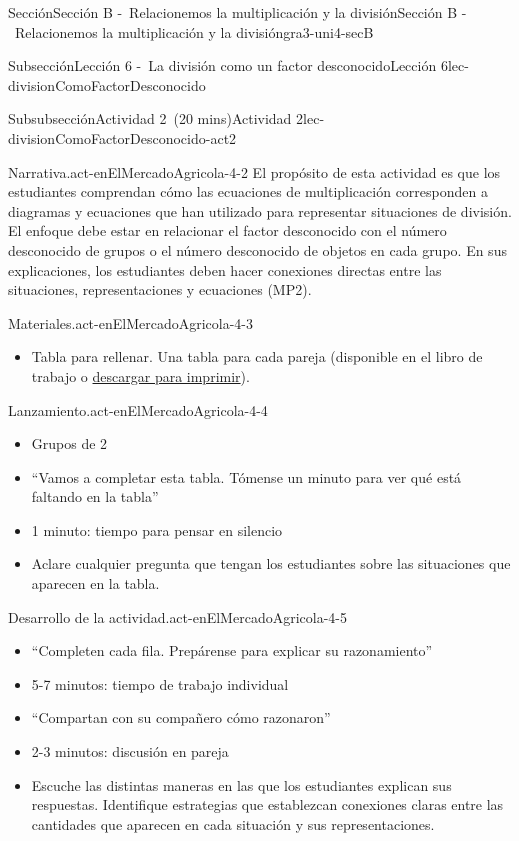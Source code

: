 \documentclass[oneside,10pt,]{article}
\begin{document}
\begin{sectionptx}{Sección}{Sección B -~Relacionemos la multiplicación y la división}{}{Sección B -~Relacionemos la multiplicación y la división}{}{}{gra3-uni4-secB}
\begin{subsectionptx}{Subsección}{Lección 6 -~La división como un factor desconocido}{}{Lección 6}{}{}{lec-divisionComoFactorDesconocido}
\begin{subsubsectionptx}{Subsubsección}{Actividad 2~(20 mins)}{}{Actividad 2}{}{}{lec-divisionComoFactorDesconocido-act2}
\begin{paragraphs}{Narrativa.}{act-enElMercadoAgricola-4-2}
El propósito de esta actividad es que los estudiantes comprendan cómo las ecuaciones de multiplicación corresponden a diagramas y ecuaciones que han utilizado para representar situaciones de división. El enfoque debe estar en relacionar el factor desconocido con el número desconocido de grupos o el número desconocido de objetos en cada grupo. En sus explicaciones, los estudiantes deben hacer conexiones directas entre las situaciones, representaciones y ecuaciones (MP2).%
\end{paragraphs}%
\begin{paragraphs}{Materiales.}{act-enElMercadoAgricola-4-3}%
%
\begin{itemize}[label=\textbullet]
\item{}Tabla para rellenar. Una tabla para cada pareja (disponible en el libro de trabajo o \href{external/act-pdf/act-enElMercadoAgricola.pdf}{descargar para imprimir}\footnotemark{}).%
\end{itemize}
\end{paragraphs}%
\begin{paragraphs}{Lanzamiento.}{act-enElMercadoAgricola-4-4}%
%
\begin{itemize}[label=\textbullet]
\item{}Grupos de 2%
\item{}``Vamos a completar esta tabla. Tómense un minuto para ver qué está faltando en la tabla''%
\item{}1 minuto: tiempo para pensar en silencio%
\item{}Aclare cualquier pregunta que tengan los estudiantes sobre las situaciones que aparecen en la tabla.%
\end{itemize}
\end{paragraphs}%
\begin{paragraphs}{Desarrollo de la actividad.}{act-enElMercadoAgricola-4-5}%
%
\begin{itemize}[label=\textbullet]
\item{}``Completen cada fila. Prepárense para explicar su razonamiento''%
\item{}5-7 minutos: tiempo de trabajo individual%
\item{}``Compartan con su compañero cómo razonaron''%
\item{}2-3 minutos: discusión en pareja%
\item{}Escuche las distintas maneras en las que los estudiantes explican sus respuestas. Identifique estrategias que establezcan conexiones claras entre las cantidades que aparecen en cada situación y sus representaciones.%

\end{itemize}
\end{paragraphs}
\end{subsubsectionptx}
\end{subsectionptx}
\end{sectionptx}
\end{document}
